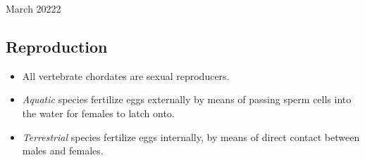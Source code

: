 \documentclass[12pt,oneside]{book} %
\begin{document}
\begin{lec}{March 20222}
\begin{itemize}
  \end{itemize}

  \subsection*{Reproduction}

  \begin{itemize}
    \item All vertebrate chordates are sexual reproducers.
    \item \textit{Aquatic} species fertilize eggs externally by means of passing sperm cells into the water for females to
    latch onto.
    \item \textit{Terrestrial} species fertilize eggs internally, by means of direct contact between males and females. 
  \end{itemize}







  




  





  

  
  



  


  



  

  

  





  




















	\end{lec}
\end{document}
